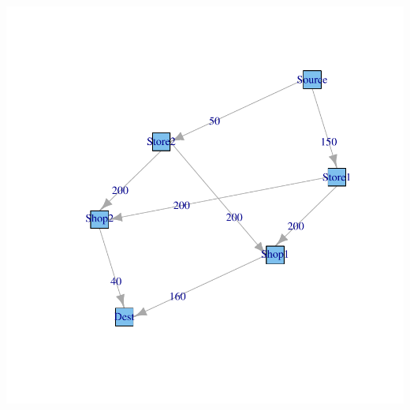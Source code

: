 \documentclass[a4paper,11pt]{scrartcl}
\begin{document}
\includegraphics{graphs-001}
\end{document}
